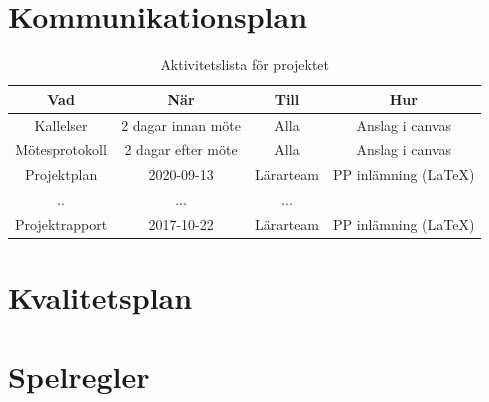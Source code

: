 \documentclass[a4paper]{article}
\begin{document}
\section{Kommunikationsplan}
\begin{table}
    \begin{center}
    \begin{tabular}{ |c|c|c|c| } 
     \hline
     Vad & När & Till & Hur \\ 
     \hline
     \hline
     Kallelser & 2 dagar innan möte & Alla & Anslag i canvas\\ 
     \hline
     Mötesprotokoll & 2 dagar efter möte & Alla & Anslag i canvas \\ 
     \hline
     Projektplan & 2020-09-13 & Lärarteam & PP inlämning (LaTeX) \\ 
     \hline
     .. & ... & ... &  \\
     \hline
     Projektrapport & 2017-10-22 & Lärarteam & PP inlämning (LaTeX) \\
     \hline
    \end{tabular}
    \caption{Aktivitetslista för projektet}
    \label{tabellnamnförreferens}
    \end{center}
    \end{table}

\section{Kvalitetsplan}

\section{Spelregler}



\end{document}

